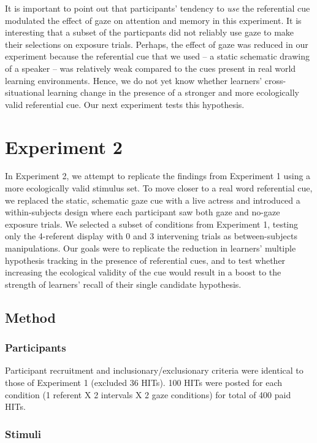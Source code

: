\documentclass[12pt,]{article}
\begin{document}
It is important to point out that participants' tendency to \emph{use}
the referential cue modulated the effect of gaze on attention and memory
in this experiment. It is interesting that a subset of the particpants
did not reliably use gaze to make their selections on exposure trials.
Perhaps, the effect of gaze was reduced in our experiment because the
referential cue that we used -- a static schematic drawing of a speaker
-- was relatively weak compared to the cues present in real world
learning environments. Hence, we do not yet know whether learners'
cross-situational learning change in the presence of a stronger and more
ecologically valid referential cue. Our next experiment tests this
hypothesis.

\section{Experiment 2}\label{experiment-2}

In Experiment 2, we attempt to replicate the findings from Experiment 1
using a more ecologically valid stimulus set. To move closer to a real
word referential cue, we replaced the static, schematic gaze cue with a
live actress and introduced a within-subjects design where each
participant saw both gaze and no-gaze exposure trials. We selected a
subset of conditions from Experiment 1, testing only the 4-referent
display with 0 and 3 intervening trials as between-subjects
manipulations. Our goals were to replicate the reduction in learners'
multiple hypothesis tracking in the presence of referential cues, and to
test whether increasing the ecological validity of the cue would result
in a boost to the strength of learners' recall of their single candidate
hypothesis.

\subsection{Method}\label{method-1}

\subsubsection{Participants}\label{participants-1}

Participant recruitment and inclusionary/exclusionary criteria were
identical to those of Experiment 1 (excluded 36 HITs). 100 HITs were
posted for each condition (1 referent X 2 intervals X 2 gaze conditions)
for total of 400 paid HITs.

\subsubsection{Stimuli}\label{stimuli-1}
\end{document}
